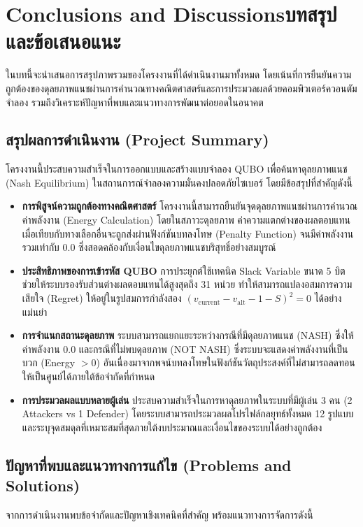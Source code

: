\chapter{\ifenglish Conclusions and Discussions\else บทสรุปและข้อเสนอแนะ\fi}

\hspace{1.5em}ในบทนี้จะนำเสนอการสรุปภาพรวมของโครงงานที่ได้ดำเนินงานมาทั้งหมด โดยเน้นที่การยืนยันความถูกต้องของดุลยภาพแนชผ่านการคำนวณทางคณิตศาสตร์และการประมวลผลด้วยคอมพิวเตอร์ควอนตัมจำลอง รวมถึงวิเคราะห์ปัญหาที่พบและแนวทางการพัฒนาต่อยอดในอนาคต

\section{สรุปผลการดำเนินงาน (Project Summary)}
โครงงานนี้ประสบความสำเร็จในการออกแบบและสร้างแบบจำลอง QUBO เพื่อค้นหาดุลยภาพแนช (Nash Equilibrium) ในสถานการณ์จำลองความมั่นคงปลอดภัยไซเบอร์ โดยมีข้อสรุปที่สำคัญดังนี้

\begin{itemize}
    \item \textbf{การพิสูจน์ความถูกต้องทางคณิตศาสตร์} โครงงานนี้สามารถยืนยันจุดดุลยภาพแนชผ่านการคำนวณค่าพลังงาน (Energy Calculation) โดยในสภาวะดุลยภาพ ค่าความแตกต่างของผลตอบแทนเมื่อเทียบกับทางเลือกอื่นจะถูกส่งผ่านฟังก์ชันบทลงโทษ (Penalty Function) จนมีค่าพลังงานรวมเท่ากับ $0.0$ ซึ่งสอดคล้องกับเงื่อนไขดุลยภาพแนชบริสุทธิ์อย่างสมบูรณ์
    \item \textbf{ประสิทธิภาพของการเข้ารหัส QUBO} การประยุกต์ใช้เทคนิค Slack Variable ขนาด 5 บิต ช่วยให้ระบบรองรับส่วนต่างผลตอบแทนได้สูงสุดถึง 31 หน่วย ทำให้สามารถแปลงอสมการความเสียใจ (Regret) ให้อยู่ในรูปสมการกำลังสอง $(v_{\text{current}} - v_{\text{alt}} - 1 - S)^2 = 0$ ได้อย่างแม่นยำ
    \item \textbf{การจำแนกสถานะดุลยภาพ} ระบบสามารถแยกแยะระหว่างกรณีที่มีดุลยภาพแนช (NASH) ซึ่งให้ค่าพลังงาน $0.0$ และกรณีที่ไม่พบดุลยภาพ (NOT NASH) ซึ่งระบบจะแสดงค่าพลังงานที่เป็นบวก (Energy $> 0$) อันเนื่องมาจากพจน์บทลงโทษในฟังก์ชันวัตถุประสงค์ที่ไม่สามารถลดทอนให้เป็นศูนย์ได้ภายใต้ข้อจำกัดที่กำหนด
    \item \textbf{การประมวลผลแบบหลายผู้เล่น} ประสบความสำเร็จในการหาดุลยภาพในระบบที่มีผู้เล่น 3 คน (2 Attackers vs 1 Defender) โดยระบบสามารถประมวลผลโปรไฟล์กลยุทธ์ทั้งหมด 12 รูปแบบ และระบุจุดสมดุลที่เหมาะสมที่สุดภายใต้งบประมาณและเงื่อนไขของระบบได้อย่างถูกต้อง
\end{itemize}

\section{ปัญหาที่พบและแนวทางการแก้ไข (Problems and Solutions)}
จากการดำเนินงานพบข้อจำกัดและปัญหาเชิงเทคนิคที่สำคัญ พร้อมแนวทางการจัดการดังนี้

